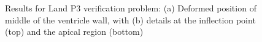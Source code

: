 \begin{figure}[ht!]
{\label{fig:land3-2}}	
%
\caption{Results for Land P3 verification problem: (a) Deformed position of middle of the ventricle wall, with (b) details at the inflection point (top) and the apical region (bottom)}
\label{fig:land3}
\end{figure}

\begin{figure}[ht!]
\centering
{}		
\subfigure[]{%
}
\end{figure}
